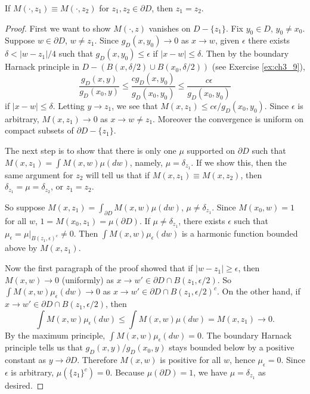 \begin{proposition}\label{prop:ch3_2.3}
If $M(\cdot,z_1) \equiv M(\cdot,z_2)$ for $z_1,z_2 \in \partial D$, then $z_1 = z_2$.
\end{proposition}

\begin{proof}
First we want to show $M(\cdot,z)$ vanishes on $D - \{z_1\}$. Fix $y_0 \in D$, $y_0 \neq x_0$. Suppose $w \in \partial D$, $w \neq z_1$. Since $g_D(x,y_0) \to 0$ as $x \to w$, given $\epsilon$ there exists $\delta < |w-z_1|/4$ such that $g_D(x,y_0) \leq \epsilon$ if $|x-w| \leq \delta$. Then by the boundary Harnack principle in $D - (B(x,\delta/2) \cup B(x_0,\delta/2))$ (see Exercise \ref{ex:ch3_9}),
\[
    \frac{g_D(x,y)}{g_D(x_0,y)} \leq \frac{cg_D(x,y_0)}{g_D(x_0,y_0)} \leq \frac{c\epsilon}{g_D(x_0,y_0)}
\]
if $|x-w| \leq \delta$. Letting $y \to z_1$, we see that $M(x,z_1) \leq c\epsilon/g_D(x_0,y_0)$. Since $\epsilon$ is arbitrary, $M(x,z_1) \to 0$ as $x \to w \neq z_1$. Moreover the convergence is uniform on compact subsets of $\partial D - \{z_1\}$.

The next step is to show that there is only one $\mu$ supported on $\partial D$ such that $M(x,z_1) = \int M(x,w)\mu(dw)$, namely, $\mu = \delta_{z_1}$. If we show this, then the same argument for $z_2$ will tell us that if $M(x,z_1) \equiv M(x,z_2)$, then $\delta_{z_1} = \mu = \delta_{z_2}$, or $z_1 = z_2$.

So suppose $M(x,z_1) = \int_{\partial D} M(x,w)\mu(dw)$, $\mu \neq \delta_{z_1}$. Since $M(x_0,w) = 1$ for all $w$, $1 = M(x_0,z_1) = \mu(\partial D)$. If $\mu \neq \delta_{z_1}$, there exists $\epsilon$ such that $\mu_\epsilon = \mu|_{B(z_1,\epsilon)^c} \neq 0$. Then $\int M(x,w)\mu_\epsilon(dw)$ is a harmonic function bounded above by $M(x,z_1)$.

Now the first paragraph of the proof showed that if $|w-z_1| \geq \epsilon$, then $M(x,w) \to 0$ (uniformly) as $x \to w' \in \partial D \cap B(z_1,\epsilon/2)$. So $\int M(x,w)\mu_\epsilon(dw) \to 0$ as $x \to w' \in \partial D \cap B(z_1,\epsilon/2)^c$. On the other hand, if $x \to w' \in \partial D \cap B(z_1,\epsilon/2)$, then
\[
    \int M(x,w)\mu_\epsilon(dw) \leq \int M(x,w)\mu(dw) = M(x,z_1) \to 0.
\]
By the maximum principle, $\int M(x,w)\mu_\epsilon(dw) = 0$. The boundary Harnack principle tells us that $g_D(x,y)/g_D(x_0,y)$ stays bounded below by a positive constant as $y \to \partial D$. Therefore $M(x,w)$ is positive for all $w$, hence $\mu_\epsilon = 0$. Since $\epsilon$ is arbitrary, $\mu(\{z_1\}^c) = 0$. Because $\mu(\partial D) = 1$, we have $\mu = \delta_{z_1}$ as desired.
\end{proof}

